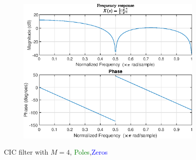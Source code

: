 \begin{figure}
\begin{subfigure}{.5\linewidth}
\label{fig:sub2}
\end{subfigure}\\[1ex]
\begin{subfigure}{\linewidth}
\centering
\includegraphics[scale=0.9]{images/freq_res_2.eps}
\caption{}
\label{fig:sub3}
\end{subfigure}
\caption{CIC filter with $M=4$, \textcolor{green}{Poles},\textcolor{blue}{Zeros}}
\label{fig:comp_filter_4}
\end{figure}


\FloatBarrier
